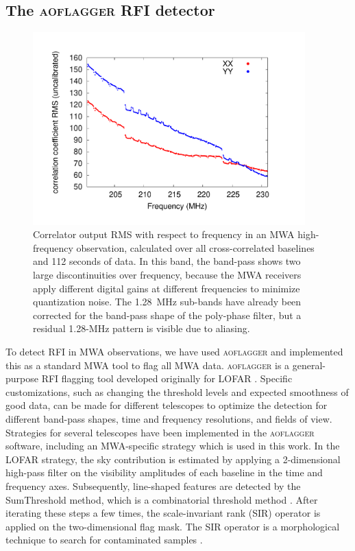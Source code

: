 \documentclass{pasa}
\begin{document}
\subsection{The \textsc{aoflagger} RFI detector}

\begin{figure}
\begin{center}\hspace*{-0.8cm}\includegraphics[width=10.5cm]{img/bandpass}
\caption{Correlator output RMS with respect to frequency in an MWA high-frequency observation, calculated over all cross-correlated baselines and 112 seconds of data. In this band, the band-pass shows two large discontinuities over frequency, because the MWA receivers apply different digital gains at different frequencies to minimize quantization noise. The 1.28~MHz sub-bands have already been corrected for the band-pass shape of the poly-phase filter, but a residual 1.28-MHz pattern is visible due to aliasing.
}
\label{fig:bandpass}
\end{center}
\end{figure}

To detect RFI in MWA observations, we have used \textsc{aoflagger} and implemented this as a standard MWA tool to flag all MWA data. \textsc{aoflagger} is a general-purpose RFI flagging tool developed originally for LOFAR \citep{lofar-radio-environment}. Specific customizations, such as changing the threshold levels and expected smoothness of good data, can be made for different telescopes to optimize the detection for different band-pass shapes, time and frequency resolutions, and fields of view. Strategies for several telescopes have been implemented in the \textsc{aoflagger} software, including an MWA-specific strategy which is used in this work. In the LOFAR strategy, the sky contribution is estimated by applying a 2-dimensional high-pass filter on the visibility amplitudes of each baseline in the time and frequency axes. Subsequently, line-shaped features are detected by the SumThreshold method, which is a combinatorial threshold method \citep{post-correlation-rfi-classification}. After iterating these steps a few times, the scale-invariant rank (SIR) operator is applied on the two-dimensional flag mask. The SIR operator is a morphological technique to search for contaminated samples \citep{scale-invariant-rank-operator}.
\end{document}
